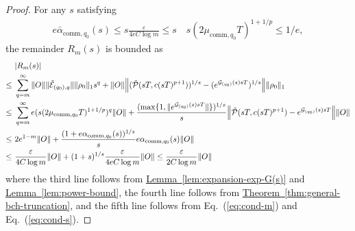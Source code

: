 \documentclass[11pt]{article}
\newcommand{\eq}[1]{(\ref{eq:#1})}
\newcommand{\thm}[1]{\hyperref[thm:#1]{Theorem~\ref*{thm:#1}}}
\newcommand{\lem}[1]{\hyperref[lem:#1]{Lemma~\ref*{lem:#1}}}
\newcommand{\G}{\mathcal{G}}
\newcommand{\E}{\mathcal{E}}
\newcommand{\eps}{\varepsilon}
\newcommand{\mc}{\mathcal}
\begin{document}
\begin{proof}
   
    For any $s$ satisfying \begin{align}
    \label{eq:cond-s}
        e\bar\alpha_{\mathrm{comm},q_0}(s)\le s\frac{\eps}{4eC \log m} \le s \quad s(2\mu_{\mathrm{comm},q_0}T)^{1+1/p} \le 1/e,
    \end{align} the remainder $R_m(s)$ is bounded as \begin{align*}
        &|R_m(s)| \\
        \le ~&\sum_{q=m}^{\infty}\|O\|\|\tilde{\E}_{(q_0),q}\|\|\rho_0\|_1 s^q + \|O\|\Big\|(\tilde{\mc P}(sT, c(sT)^{p+1}))^{1/s}-(e^{\G_{(q_0)}(s)sT})^{1/s}\Big\|\|\rho_0\|_1 \\
        \le ~& \sum_{q=m}^{\infty} e(s(2\mu_{\mathrm{comm},q_0} T)^{1+1/p})^{q}\|O\|+\frac{(\max\{1, \|e^{\G_{(q_0)}(s) sT}\|\})^{1/s}}{s}\Bigl\|\tilde{\mc P}(sT, c(sT)^{p+1})-e^{\G_{(q_0)}(s)sT}\Bigr\|\|O\|\\
        \le ~&2e^{1-m} \|O\|+ \frac{(1+e\alpha_{\mathrm{comm},q_0}(s))^{1/s}}{s}e\alpha_{\mathrm{comm},q_0}(s)\|O\| \\
        \le ~& \frac{\eps}{4C\log m} \|O\|+(1+s)^{1/s}\frac{\eps}{4eC\log m}\|O\| \le \frac{\eps}{2C\log m} \|O\|
    \end{align*}
    where the third line follows from \lem{expansion-exp-G(s)} and \lem{power-bound}, the fourth line follows from 
    \thm{general-bch-truncation}, and the fifth line follows from Eq.~\eq{cond-m} and Eq.~\eq{cond-s}.
    

\end{proof}
\end{document}
